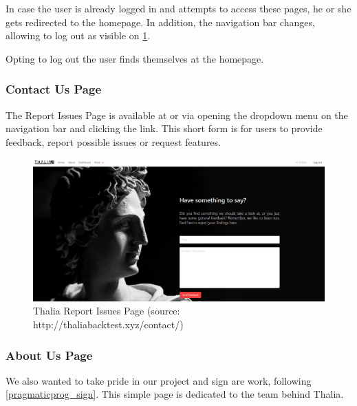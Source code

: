 \documentclass[main.tex]{subfiles}
\begin{document}
In case the user is already logged in and attempts to access these pages, he or she gets redirected to the homepage. In addition, the navigation bar changes, allowing to log out as visible on \figurename{\ref{thalia_issues}}.

Opting to log out the user finds themselves at the homepage.



\subsubsection{Contact Us Page}



The Report Issues Page is available at  or via opening the dropdown menu on the navigation bar and clicking the link. This short form is for users to provide feedback, report possible issues or request features.



\begin{figure}[H]

   \centering

   \includegraphics[width=\textwidth]{08Appendices/081User/081Pictures/issues.png}

   \caption{Thalia Report Issues Page (source: http://thaliabacktest.xyz/contact/)}

   \label{thalia_issues}

\end{figure}



\subsubsection{About Us Page}



We also wanted to take pride in our project and sign are work, following \ref{pragmaticprog_sign}. This simple page is dedicated to the team behind Thalia.
\end{document}
